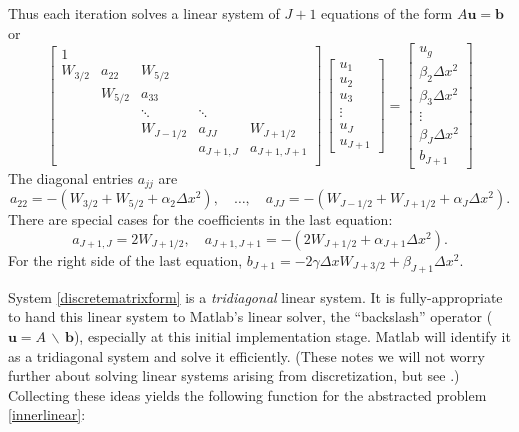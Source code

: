 \documentclass[letterpaper,final,12pt,reqno]{amsart}
\begin{document}
Thus each iteration solves a linear system of $J+1$ equations of the form $A \mathbf{u} = \mathbf{b}$ or
\begin{equation}
\begin{bmatrix}
1 &  &  &  &  \\
W_{3/2} & a_{22} & W_{5/2} &  &  \\
 & W_{5/2} & a_{33} &  &  \\
 &  & \ddots & \ddots &  \\
 &  & W_{J-1/2} & a_{JJ} & W_{J+1/2} \\
 &  &  & a_{J+1,J} & a_{J+1,J+1} \\
\end{bmatrix}\,
\begin{bmatrix}
u_1 \\ u_2 \\ u_3 \\ \vdots \\ u_J \\ u_{J+1}
\end{bmatrix}
=
\begin{bmatrix}
u_g \\ \beta_2 \Delta x^2 \\ \beta_3 \Delta x^2 \\ \vdots \\ \beta_J \Delta x^2 \\ b_{J+1}
\end{bmatrix}  \label{discretematrixform}
\end{equation}
The diagonal entries $a_{jj}$ are
  $$a_{22} = -(W_{3/2}+W_{5/2}+\alpha_2 \Delta x^2), \quad \dots, \quad a_{JJ} = -(W_{J-1/2}+W_{J+1/2}+\alpha_J \Delta x^2).$$
There are special cases for the coefficients in the last equation:
  $$a_{J+1,J} = 2 W_{J+1/2}, \quad a_{J+1,J+1} = -(2 W_{J+1/2}+\alpha_{J+1}\Delta x^2).$$
For the right side of the last equation, $b_{J+1} = -2 \gamma \Delta x W_{J+3/2} + \beta_{J+1} \Delta x^2$.

System \eqref{discretematrixform} is a \emph{tridiagonal} linear system.  It is fully-appropriate to hand this linear system to Matlab's linear solver, the ``backslash'' operator ($\mathbf{u} = A\, \backslash\, \mathbf{b}$), especially at this initial implementation stage. Matlab will identify it as a tridiagonal system and solve it efficiently.  (These notes we will not worry further about solving linear systems arising from discretization, but see \cite{Bueler2021}.)  Collecting these ideas yields the following function for the abstracted problem \eqref{innerlinear}:
\end{document}
